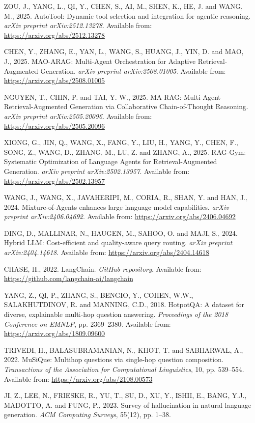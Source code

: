\documentclass[12pt,a4paper]{article}
\begin{document}
ZOU, J., YANG, L., QI, Y., CHEN, S., AI, M., SHEN, K., HE, J. and WANG, M., 2025. AutoTool: Dynamic tool selection and integration for agentic reasoning. \textit{arXiv preprint arXiv:2512.13278}. Available from: \url{https://arxiv.org/abs/2512.13278}

CHEN, Y., ZHANG, E., YAN, L., WANG, S., HUANG, J., YIN, D. and MAO, J., 2025. MAO-ARAG: Multi-Agent Orchestration for Adaptive Retrieval-Augmented Generation. \textit{arXiv preprint arXiv:2508.01005}. Available from: \url{https://arxiv.org/abs/2508.01005}

NGUYEN, T., CHIN, P. and TAI, Y.-W., 2025. MA-RAG: Multi-Agent Retrieval-Augmented Generation via Collaborative Chain-of-Thought Reasoning. \textit{arXiv preprint arXiv:2505.20096}. Available from: \url{https://arxiv.org/abs/2505.20096}

XIONG, G., JIN, Q., WANG, X., FANG, Y., LIU, H., YANG, Y., CHEN, F., SONG, Z., WANG, D., ZHANG, M., LU, Z. and ZHANG, A., 2025. RAG-Gym: Systematic Optimization of Language Agents for Retrieval-Augmented Generation. \textit{arXiv preprint arXiv:2502.13957}. Available from: \url{https://arxiv.org/abs/2502.13957}

WANG, J., WANG, X., JAVAHERIPI, M., CORIA, R., SHAN, Y. and HAN, J., 2024. Mixture-of-Agents enhances large language model capabilities. \textit{arXiv preprint arXiv:2406.04692}. Available from: \url{https://arxiv.org/abs/2406.04692}

DING, D., MALLINAR, N., HAUGEN, M., SAHOO, O. and MAJI, S., 2024. Hybrid LLM: Cost-efficient and quality-aware query routing. \textit{arXiv preprint arXiv:2404.14618}. Available from: \url{https://arxiv.org/abs/2404.14618}

CHASE, H., 2022. LangChain. \textit{GitHub repository}. Available from: \url{https://github.com/langchain-ai/langchain}

YANG, Z., QI, P., ZHANG, S., BENGIO, Y., COHEN, W.W., SALAKHUTDINOV, R. and MANNING, C.D., 2018. HotpotQA: A dataset for diverse, explainable multi-hop question answering. \textit{Proceedings of the 2018 Conference on EMNLP}, pp. 2369--2380. Available from: \url{https://arxiv.org/abs/1809.09600}

TRIVEDI, H., BALASUBRAMANIAN, N., KHOT, T. and SABHARWAL, A., 2022. MuSiQue: Multihop questions via single-hop question composition. \textit{Transactions of the Association for Computational Linguistics}, 10, pp. 539--554. Available from: \url{https://arxiv.org/abs/2108.00573}

JI, Z., LEE, N., FRIESKE, R., YU, T., SU, D., XU, Y., ISHII, E., BANG, Y.J., MADOTTO, A. and FUNG, P., 2023. Survey of hallucination in natural language generation. \textit{ACM Computing Surveys}, 55(12), pp. 1--38.
\end{document}
